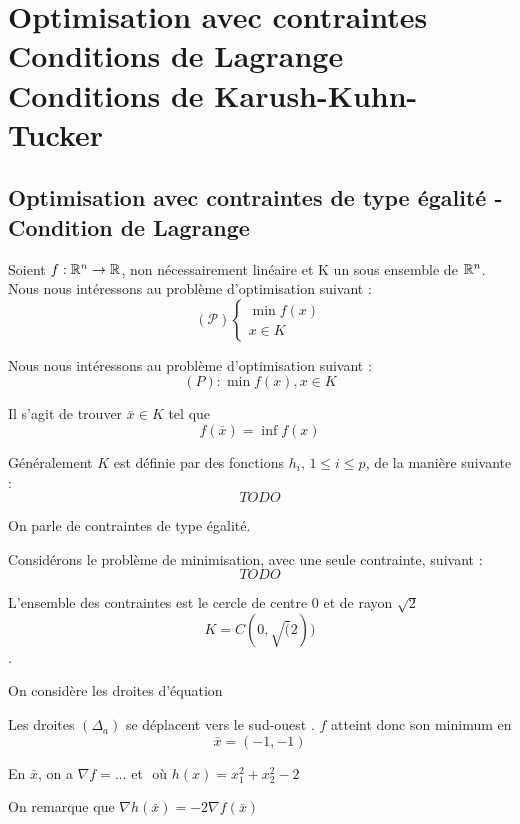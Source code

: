 		
\section{Optimisation avec contraintes \\ Conditions de Lagrange \\ Conditions de Karush-Kuhn-Tucker }

\subsection{Optimisation avec contraintes de type égalité - Condition de Lagrange}
Soient $f : \mathbb{R}^n \rightarrow \mathbb{R}$, non nécessairement linéaire et K un sous ensemble de $\mathbb{R}^n$.\\
Nous nous intéressons au problème d'optimisation suivant :
 \[ (\mathcal{P})\begin{cases}\min f(x) \\ x \in K \end{cases} \]


Nous nous intéressons au problème d'optimisation suivant : \[ (P) : \min f(x), x \in K \]

Il s'agit de trouver $\bar{x} \in K$ tel que \[ f(\bar{x}) = \inf f(x) \]


Généralement $K$ est définie par des fonctions $h_i$, $1 \leq i \leq p$, de la manière suivante : \[ TODO \]

On parle de contraintes de type égalité.


\begin{exemple}
	Considérons le problème de minimisation, avec une seule contrainte, suivant : \[ TODO \]	
	
	L'ensemble des contraintes est le cercle de centre 0 et de rayon $\sqrt 2$ \[ K = C(0, \sqrt(2)) \].
	
	On considère les droites d'équation \[  \]
	
	Les droites $(\Delta_a)$ se déplacent vers le \og sud-ouest \fg. $f$ atteint donc son minimum en \[ \bar{x} = (-1, -1) \]
	
	En $\bar{x}$, on a $\displaystyle \nabla f = ...$ et $ $ où $h(x) = x_1^2 + x_2^2 - 2$
	
	On remarque que $ \nabla h( \bar{x} ) = -2  \nabla f( \bar{x} ) $
	
	
\end{exemple}


